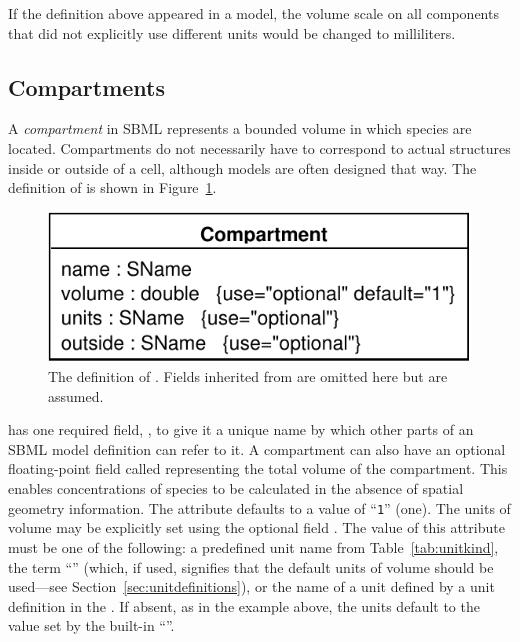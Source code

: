 \documentclass[10pt]{cekarticle}
\newcommand{\vref}[1]{\ref{#1}}
\newenvironment{blockChanged}{\color{BrickRed}}{}
\begin{document}
If the definition above appeared in a model, the volume scale on all
components that did not explicitly use different units would be changed to
milliliters.  


\subsection{Compartments}
\label{sec:compartments}

A \emph{compartment} in SBML represents a bounded volume in which species
are located.  Compartments do not necessarily have to correspond to actual
structures inside or outside of a cell, although models are often designed
that way.  The definition of  is shown in
Figure~\vref{fig:compartment}.

\begin{figure}[htb]
  \vspace*{1pt}
  \centering
  \includegraphics[scale = 0.65]{figs/compartment}
  \vspace*{-3pt}
  \caption{The definition of .  
    Fields inherited from  are omitted here but are assumed.}
  \label{fig:compartment}
\end{figure}

\begin{blockChanged}
 has one required field,
, to give it a unique name by which other parts of an SBML
model definition can refer to it.  A compartment can also have an optional
floating-point field called  representing the total volume
of the compartment.  This enables concentrations of species to be
calculated in the absence of spatial geometry information.%
\end{blockChanged}
The  attribute defaults to a value of ``\texttt{1}'' (one).
\begin{blockChanged}
The units of volume may be explicitly set using the optional field
.  The value of this attribute must be one of the following:
a predefined unit name from Table~\ref{tab:unitkind}, the term
``'' (which, if used, signifies that the default units of
volume should be used---see Section~\ref{sec:unitdefinitions}), or the
name of a unit defined by a unit definition in the 
.  If absent, as in the example above, the units default to
the value set by the built-in ``''.\end{blockChanged}
\end{document}
